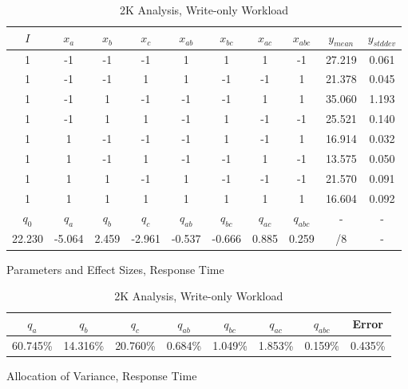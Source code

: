 \documentclass[11pt,a4paper]{article}
\begin{document}
\begin{table}
    \begin{subtable}{1.0\linewidth}\centering
        {\begin{tabular}{|cccccccc|cc|}
            \hline
            $I$ & $x_a$ & $x_b$ & $x_c$ & $x_{ab}$ & $x_{bc}$ & $x_{ac}$ & $x_{abc}$ & $y_{mean}$ & $y_{stddev}$\\
            \hline
                  1 &     -1 &     -1 &     -1 &      1 &      1 &     1 &    -1 & 27.219 &   0.061 \\
                  1 &     -1 &     -1 &      1 &      1 &     -1 &    -1 &     1 & 21.378 &   0.045 \\
                  1 &     -1 &      1 &     -1 &     -1 &     -1 &     1 &     1 & 35.060 &   1.193 \\
                  1 &     -1 &      1 &      1 &     -1 &      1 &    -1 &    -1 & 25.521 &   0.140 \\
                  1 &      1 &     -1 &     -1 &     -1 &      1 &    -1 &     1 & 16.914 &   0.032 \\
                  1 &      1 &     -1 &      1 &     -1 &     -1 &     1 &    -1 & 13.575 &   0.050 \\
                  1 &      1 &      1 &     -1 &      1 &     -1 &    -1 &    -1 & 21.570 &   0.091 \\
                  1 &      1 &      1 &      1 &      1 &      1 &     1 &     1 & 16.604 &   0.092 \\
            \hline
            $q_0$ & $q_a$ & $q_b$ & $q_c$ & $q_{ab}$ & $q_{bc}$ & $q_{ac}$ & $q_{abc}$ & - & -\\
             22.230 & -5.064 &  2.459 & -2.961 & -0.537 & -0.666 & 0.885 & 0.259 &  /8 &       - \\
            \hline
        \end{tabular}
        \caption{Parameters and Effect Sizes, Response Time}}
    \end{subtable}
    \begin{subtable}{1.0\linewidth}\centering
       {\begin{tabular}{|cccccccc|}
            \hline
            $q_a$ & $q_b$ & $q_c$ & $q_{ab}$ & $q_{bc}$ & $q_{ac}$ & $q_{abc}$ & Error \\
            \hline
            60.745\% & 14.316\% & 20.760\% &  0.684\% &  1.049\% & 1.853\% & 0.159\% &  0.435\% \\
            \hline
        \end{tabular}
        \caption{Allocation of Variance, Response Time}}
    \end{subtable}

    \caption{2K Analysis, Write-only Workload}
    \label{2k:write-only}
\end{table}
\end{document}
